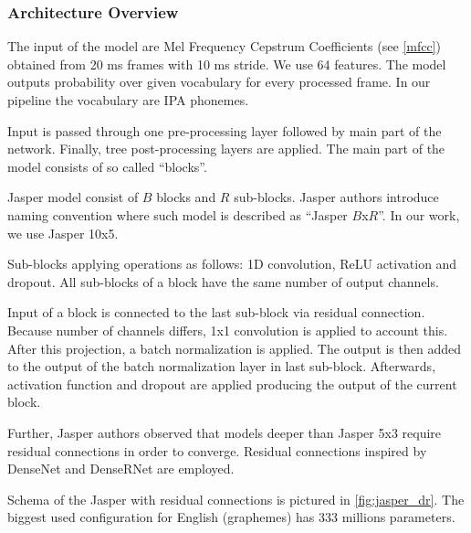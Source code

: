 \subsubsection{Architecture Overview}
The input of the model are Mel Frequency Cepstrum Coefficients (see \cref{mfcc}) obtained from 20 ms frames with 10 ms stride. We use 64 features. The model outputs probability over given vocabulary for every processed frame. In our pipeline the vocabulary are IPA phonemes.

Input is passed through one pre-processing layer followed by main part of the network. Finally, tree post-processing layers are applied. The main part of the model consists of so called ``blocks''.

Jasper model consist of $B$ blocks and $R$ sub-blocks. Jasper authors introduce naming convention where such model is described as ``Jasper $B$x$R$''. In our work, we use Jasper 10x5.

Sub-blocks applying operations as follows: 1D convolution, ReLU activation and dropout. All sub-blocks of a block have the same number of output channels. 

Input of a block is connected to the last sub-block via residual connection. Because number of channels differs, 1x1 convolution is applied to account this. After this projection, a batch normalization is applied. The output is then added to the output of the batch normalization layer in last sub-block. Afterwards, activation function and dropout are applied producing the output of the current block.

Further, Jasper authors observed that models deeper than Jasper 5x3 require residual connections in order to converge. Residual connections inspired by DenseNet  and DenseRNet  are employed.

Schema of the Jasper with residual connections is pictured in \cref{fig:jasper_dr}. The biggest used configuration for English (graphemes) has 333 millions parameters.


